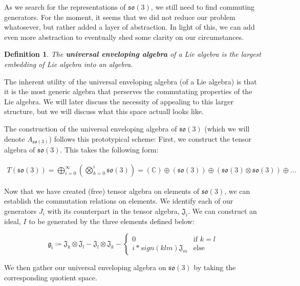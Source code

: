 \documentclass[10pt]{ucthesis}
\newcommand{\C}{\mathbb{C}}
\newtheorem{definition}{Definition}[chapter]
\begin{document}
As we search for the representations of $\mathfrak{so}(3)$, we still need to find commuting generators. For the moment, it seems that we did not reduce our problem whatosever, but rather added a layer of abstraction. In light of this, we can add even more abstraction to eventually shed some clarity on our circumstances.

\begin{definition}
	The \textbf{universal enveloping algebra} of a Lie algebra is the largest embedding of Lie algebra into an algebra. 
\end{definition}

The inherent utility of the universal enveloping algebra (of a Lie algebra) is that it is the most generic algebra that perserves the commutating properties of the Lie algebra. We will later discuss the necessity of appealing to this larger structure, but we will discuss what this space actuall looks like. 

The construction of the universal enveloping algebra of $\mathfrak{so}(3)$ (which we will denote $A_{\mathfrak{so}(3)}$) follows this prototypical scheme: First, we construct the tensor algebra of $\mathfrak{so}(3)$. This takes the following form:

\begin{equation}
	\begin{aligned}
		T(\mathfrak{so}(3)) = \bigoplus_{i=0}^\infty \left(\bigotimes_{k=0}^i \mathfrak{so}(3)\right) = \left(\C\right) \oplus \left(\mathfrak{so}(3)\right) \oplus \left(\mathfrak{so}(3)\otimes \mathfrak{so}(3)\right) \oplus \hdots
	\end{aligned}
\end{equation} 

Now that we have created (free) tensor algebra on elements of $\mathfrak{so}(3)$, we can establish the commutation relations on elements. We identify each of our generators $J_i$ with its counterpart in the tensor algebra, $\mathfrak{J}_i$. We can construct an ideal, $I$ to be generated by the three elements defined below: 

$$\mathfrak{g_i} \coloneq \mathfrak{J}_k \otimes \mathfrak{J}_l - \mathfrak{J}_l\otimes \mathfrak{J}_k - \begin{cases}
	0 & \text{if }k=l	\\
	i*sign(klm) \mathfrak{J}_m &\text{else}
\end{cases}$$

We then gather our universal enveloping algebra on $\mathfrak{so}(3)$ by taking the corresponding quotient space.
\end{document}

